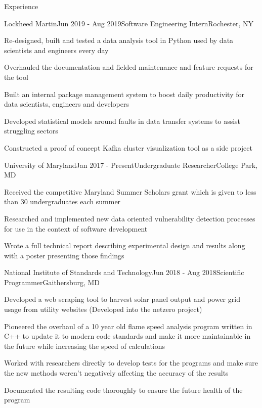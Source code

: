 \documentclass{resume} %
\begin{document}
\begin{rSection}{Experience}


\begin{rSubsection}{Lockheed Martin}{Jun 2019 - Aug 2019}{Software Engineering Intern}{Rochester, NY}
\item Re-designed, built and tested a data analysis tool in Python used by data scientists and engineers every day
\item Overhauled the documentation and fielded maintenance and feature requests for the tool
\item Built an internal package management system to boost daily productivity for data scientists, engineers and developers
\item Developed statistical models around faults in data transfer systems to assist struggling sectors
\item Constructed a proof of concept Kafka cluster visualization tool as a side project
\end{rSubsection}


\begin{rSubsection}{University of Maryland}{Jan 2017 - Present}{Undergraduate Researcher}{College Park, MD}
\item Received the competitive Maryland Summer Scholars grant which is given to less than 30 undergraduates each summer
\item Researched and implemented new data oriented vulnerability detection processes for use in the context of software development
\item Wrote a full technical report describing experimental design and results along with a poster presenting those findings
\end{rSubsection}


\begin{rSubsection}{National Institute of Standards and Technology}{Jun 2018 - Aug 2018}{Scientific Programmer}{Gaithersburg, MD}
\item Developed a web scraping tool to harvest solar panel output and power grid usage from utility websites (Developed into the netzero project)
\item Pioneered the overhaul of a 10 year old flame speed analysis program written in C++ to update it to modern code standards and make it more maintainable in the future while increasing the speed of calculations
\item Worked with researchers directly to develop tests for the programs and make sure the new methods weren't negatively affecting the accuracy of the results
\item Documented the resulting code thoroughly to ensure the future health of the program
\end{rSubsection}


\end{rSection}
\end{document}
